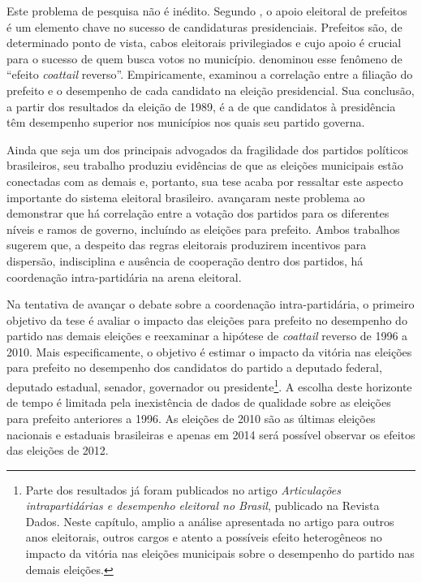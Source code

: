 Este problema de pesquisa não é inédito. Segundo \citet{Ames1994}, o apoio eleitoral de prefeitos é um elemento chave no sucesso de candidaturas presidenciais. Prefeitos são, de determinado ponto de vista, cabos eleitorais privilegiados e cujo apoio é crucial para o sucesso de quem busca votos no município. \citeauthor{Ames1994} denominou esse fenômeno de ``efeito \emph{coattail} reverso''. Empiricamente, \citeauthor{Ames1994} examinou a correlação entre a filiação do prefeito e o desempenho de cada candidato na eleição presidencial. Sua conclusão, a partir dos resultados da eleição de 1989, é a de que candidatos à presidência têm desempenho superior nos municípios nos quais seu partido governa.

Ainda que \citeauthor{Ames1994} seja um dos principais advogados da fragilidade dos partidos políticos brasileiros, seu trabalho produziu evidências de que as eleições municipais estão conectadas com as demais e, portanto, sua tese acaba por ressaltar este aspecto importante do sistema eleitoral brasileiro. \citet{Carneiro2008} avançaram neste problema ao demonstrar que há correlação entre a votação dos partidos para os diferentes níveis e ramos de governo, incluíndo as eleições para prefeito. Ambos trabalhos sugerem que, a despeito das regras eleitorais produzirem incentivos para dispersão, indisciplina e ausência de cooperação dentro dos partidos, há coordenação intra-partidária na arena eleitoral.

Na tentativa de avançar o debate sobre a coordenação intra-partidária, o primeiro objetivo da tese é avaliar o impacto das eleições para prefeito no desempenho do partido nas demais eleições e reexaminar a hipótese de \emph{coattail} reverso de 1996 a 2010. Mais especificamente, o objetivo é estimar o impacto da vitória nas eleições para prefeito no desempenho dos candidatos do partido a deputado federal, deputado estadual, senador, governador ou presidente\footnote{Parte dos resultados já foram publicados no artigo \citet*{Avelino2012} \emph{Articulações intrapartidárias e desempenho eleitoral no Brasil}, publicado na Revista Dados. Neste capítulo, amplio a análise apresentada no artigo para outros anos eleitorais, outros cargos e atento a possíveis efeito heterogêneos no impacto da vitória nas eleições municipais sobre o desempenho do partido nas demais eleições.}. A escolha deste horizonte de tempo é limitada pela inexistência de dados de qualidade sobre as eleições para prefeito anteriores a 1996. As eleições de 2010 são as últimas eleições nacionais e estaduais brasileiras e apenas em 2014 será possível observar os efeitos das eleições de 2012.


